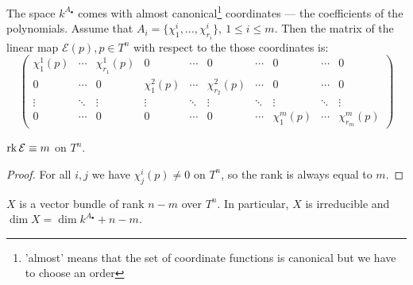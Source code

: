 \begin{remark}
    The space $k^{A_\bullet}$ comes with almost canonical\footnote{'almost' means that the set of coordinate functions is canonical but we have to choose an order} coordinates --- the coefficients of the polynomials. Assume that $A_i = \{ \chi^i_1, \dots, \chi^i_{r_i} \},\ 1 \le i \le m$. Then the matrix of the linear map $\mathcal E(p), p \in T^n$ with respect to the those coordinates is:
    \[
    \begin{pmatrix}
        \chi_1^1(p) & \cdots & \chi_{r_1}^1(p) & 0 & \cdots & 0 & \cdots & 0 & \cdots & 0 \\
        0 & \cdots & 0 & \chi^2_1(p) & \cdots & \chi^2_{r_2}(p) & \cdots & 0 & \cdots & 0 \\
        \vdots & \ddots & \vdots & \vdots & \ddots & \vdots & \ddots & \vdots & \ddots & \vdots \\
        0 & \cdots & 0 & 0 & \cdots & 0 & \cdots & \chi^m_1(p) & \cdots & \chi^m_{r_m}(p)
    \end{pmatrix}
    \]
\end{remark}

\begin{claim}
    $\operatorname{rk} \mathcal E \equiv m$ on $T^n$. 
\end{claim}
\begin{proof}
    For all $i, j$ we have $\chi_j^i (p) \ne 0$ on $T^n$, so the rank is always equal to $m$.
\end{proof}

\begin{corollary}
    $X$ is a vector bundle of rank $n - m$ over $T^n$. In particular, $X$ is irreducible and $\dim X = \dim k^{A_\bullet} + n - m$.
\end{corollary}

